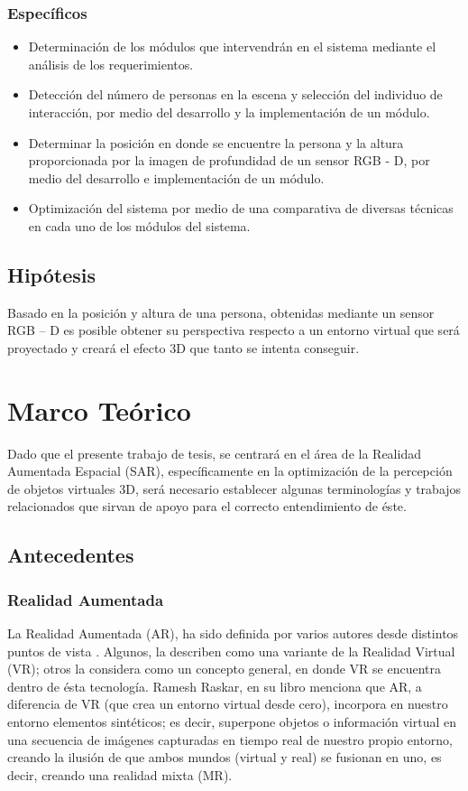 \documentclass[a4paper,openright,12pt]{report}
\begin{document}
\subsection{Específicos}
\begin{itemize}
\item Determinación de los módulos que intervendrán en el sistema mediante el análisis de los requerimientos.
\item Detección del número de personas en la escena y selección del individuo de interacción, por medio del desarrollo y la implementación de un módulo.
\item Determinar la posición en donde se encuentre la persona y la altura proporcionada por la imagen de profundidad de un sensor RGB - D, por medio del desarrollo e implementación de un módulo.
\item Optimización del sistema por medio de una comparativa de diversas técnicas en cada uno de los módulos del sistema.
\end{itemize}
%

\section{Hipótesis}
Basado en la posición y altura de una persona, obtenidas mediante un sensor RGB – D es posible obtener su perspectiva respecto a un entorno virtual que será proyectado y creará el efecto 3D que tanto se intenta conseguir.

\chapter{Marco Teórico}\label{cap.marcoteorico}
Dado que el presente trabajo de tesis, se centrará en el área de la Realidad Aumentada Espacial (SAR), específicamente en la optimización de la percepción de objetos virtuales 3D, será necesario establecer algunas terminologías y trabajos relacionados que sirvan de apoyo para el correcto entendimiento de éste.
\section{Antecedentes}
\subsection{Realidad Aumentada}
La Realidad Aumentada (AR), ha sido definida por varios autores desde distintos puntos de vista \cite{milgram1994,azuma1997}. Algunos, la describen como una variante de la Realidad Virtual (VR); otros la considera como un concepto general, en donde VR se encuentra dentro de ésta tecnología. Ramesh Raskar, en su libro \cite{Bimber2005} menciona que AR, a diferencia de VR (que crea un entorno virtual desde cero), incorpora en nuestro entorno elementos sintéticos; es decir, superpone objetos o información virtual en una secuencia de imágenes capturadas en tiempo real de nuestro propio entorno, creando la ilusión de que ambos mundos (virtual y real) se fusionan en uno, es decir, creando una realidad mixta (MR).\\
\end{document}
